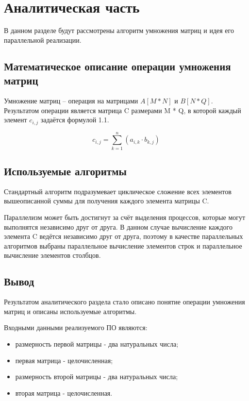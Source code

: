 \documentclass[12pt,a4paper]{report}
\begin{document}
\newpage
\chapter{Аналитическая часть}

В данном разделе будут рассмотрены алгоритм  умножения матриц и идея его параллельной реализации.

\section{Математическое описание операции умножения матриц}

Умножение матриц -- операция на матрицами $A[M * N]$ и $B[N * Q]$. 
Результатом операции является матрица C размерами M * Q, в которой каждый элемент $c_{i,j}$ задаётся 
формулой 1.1.

\begin{equation}
	c_{i,j} = \sum\limits_{k=1}^n (a_{i,k} \cdot b_{k,j})
	\label{formula:1}
\end{equation}

\section{Используемые алгоритмы}

Стандартный алгоритм подразумевает циклическое сложение всех элементов вышеописанной суммы для получения
каждого элемента матрицы C.

Параллелизм может быть достигнут за счёт выделения процессов, которые могут выполнятся независимо друг от 
друга.
В данном случае вычисление каждого элемента C ведётся независимо друг от друга, поэтому в качестве 
параллельных алгоритмов выбраны параллельное вычисление элементов строк и параллельное вычисление 
элементов столбцов.

\section*{Вывод}

Результатом аналитического раздела стало  описано понятие операции 
умножения матриц и описаны используемые алгоритмы.

Входными данными реализуемого ПО являются:

\begin{itemize}
	\item размерность первой матрицы - два натуральных числа;
	\item первая матрица - целочисленная;
	\item размерность второй матрицы - два натуральных числа;
	\item вторая матрица - целочисленная.
\end{itemize}
\end{document}
